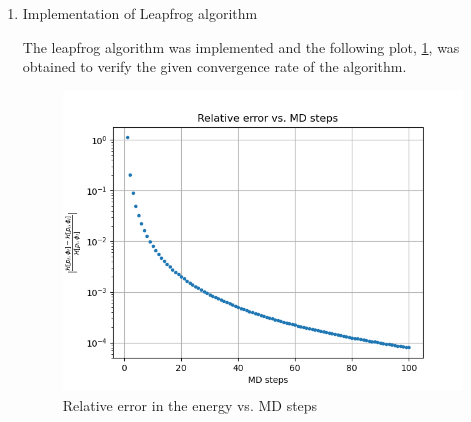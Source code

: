 \documentclass{article}
\begin{document}
\begin{enumerate}
\item{Implementation of Leapfrog algorithm}

The leapfrog algorithm was implemented and the following plot, \ref{fig:lf_conv}, was obtained to verify the given convergence rate of the algorithm.
\begin{figure}[h!]
    \centering
    \includegraphics[width = .8\linewidth]{leapfrog_conv.png}
    \caption{Relative error in the energy vs. MD steps}
    \label{fig:lf_conv}
\end{figure}

\end{enumerate}
\end{document}
